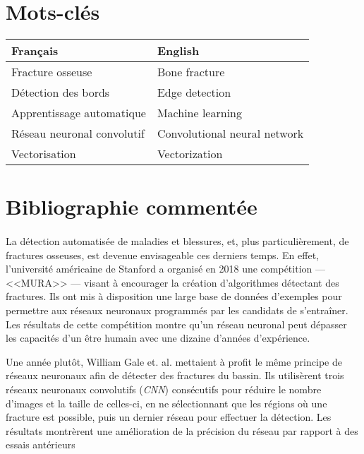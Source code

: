 \documentclass[a4paper]{article}
\begin{document}
\section{Mots-clés}

\begin{table}[h]
    \centering
    \label{tab:keywords}
    \begin{tabular}{l|l}
    Français & English \\\hline
    Fracture osseuse & Bone fracture \\
    Détection des bords & Edge detection \\
    Apprentissage automatique & Machine learning \\
    Réseau neuronal convolutif & Convolutional neural network  \\
    Vectorisation & Vectorization \\
    \end{tabular}
\end{table}

\section{Bibliographie commentée}

\paragraph{}

La détection automatisée de maladies et blessures, et, plus particulièrement, de fractures osseuses, est devenue
envisageable ces derniers temps. En effet, l'université américaine de Stanford a organisé en 2018 une compétition ---
<<MURA>> --- visant à encourager la création d'algorithmes détectant des fractures.  Ils ont mis à disposition une large
base de données d'exemples pour permettre aux réseaux neuronaux programmés par les candidats de s'entraîner.  Les
résultats de cette compétition montre qu'un réseau neuronal peut dépasser les capacités d'un être humain avec une dizaine
d'années d'expérience\cite{mura-competition}.

Une année plutôt, William Gale et. al. mettaient à profit le même principe de réseaux neuronaux afin de détecter des
fractures du bassin\cite{detect-hip}.  Ils utilisèrent trois réseaux neuronaux convolutifs (\emph{CNN}) consécutifs
pour réduire le nombre d'images et la taille de celles-ci, en ne sélectionnant que les régions où une fracture est
possible, puis un dernier réseau pour effectuer la détection. Les résultats montrèrent une amélioration de la précision du
réseau par rapport à des essais antérieurs
\end{document}

